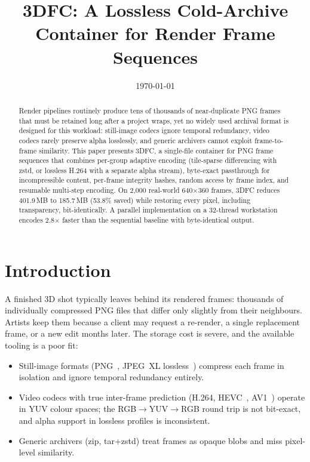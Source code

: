 \documentclass[11pt,a4paper]{article}
\title{3DFC: A Lossless Cold-Archive Container for Render Frame Sequences}
\author{}
\date{\today}
\begin{document}
\maketitle

\begin{abstract}
Render pipelines routinely produce tens of thousands of near-duplicate PNG
frames that must be retained long after a project wraps, yet no widely used
archival format is designed for this workload: still-image codecs ignore
temporal redundancy, video codecs rarely preserve alpha losslessly, and generic
archivers cannot exploit frame-to-frame similarity. This paper presents 3DFC, a
single-file container for PNG frame sequences that combines per-group adaptive
encoding (tile-sparse differencing with zstd, or lossless H.264 with a separate
alpha stream), byte-exact passthrough for incompressible content, per-frame
integrity hashes, random access by frame index, and resumable multi-step
encoding. On 2,000 real-world 640$\times$360 frames, 3DFC reduces 401.9\,MB to
185.7\,MB (53.8\% saved) while restoring every pixel, including transparency,
bit-identically. A parallel implementation on a 32-thread workstation encodes
2.8$\times$ faster than the sequential baseline with byte-identical output.
\end{abstract}

\section{Introduction}
\label{sec:intro}

A finished 3D shot typically leaves behind its rendered frames: thousands of
individually compressed PNG files that differ only slightly from their
neighbours. Artists keep them because a client may request a re-render, a
single replacement frame, or a new edit months later. The storage cost is
severe, and the available tooling is a poor fit:

\begin{itemize}
  \item Still-image formats (PNG~\cite{png}, JPEG~XL lossless~\cite{jxl}) compress each
  frame in isolation and ignore temporal redundancy entirely.
  \item Video codecs with true inter-frame prediction (H.264, HEVC~\cite{hevc}, AV1~\cite{av1})
  operate in YUV colour spaces; the RGB$\to$YUV$\to$RGB round trip is not
  bit-exact, and alpha support in lossless profiles is inconsistent.
  \item Generic archivers (zip, tar+zstd) treat frames as opaque blobs and miss
  pixel-level similarity.
\end{itemize}
\end{document}
